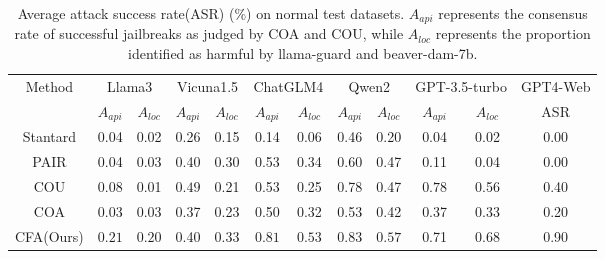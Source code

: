 \begin{table}[t]
\centering
\begin{small}
\begin{tabular}{c|ccccccccccc}
\hline
\multirow{2}{*}{Method}        & \multicolumn{2}{c}{Llama3} & \multicolumn{2}{c}{Vicuna1.5}       & \multicolumn{2}{c}{ChatGLM4}       & \multicolumn{2}{c}{Qwen2}            & \multicolumn{2}{c}{GPT-3.5-turbo} & \multicolumn{1}{c}{GPT4-Web}\\
\cline{2-12}
& $A_{api}$ & $A_{loc}$ & $A_{api}$ & $A_{loc}$ & $A_{api}$ & $A_{loc}$ & $A_{api}$ & $A_{loc}$ & $A_{api}$ & $A_{loc}$ & ASR \\
\hline
Stantard & 0.04 & 0.02 & 0.26 & 0.15 & 0.14 & 0.06 & 0.46 & 0.20 & 0.04 & 0.02 & 0.00 \\
PAIR & 0.04 & 0.03 & 0.40 & 0.30 & 0.53 & 0.34 & 0.60 & 0.47 & 0.11 & 0.04 & 0.00\\
COU & 0.08 & 0.01 & $\mathbf{0.49}$ & 0.21 & 0.53 & 0.25 & 0.78 & 0.47 & $\mathbf{0.78}$ & 0.56 & 0.40\\
COA & 0.03 & 0.03 & 0.37 & 0.23 & 0.50 & 0.32 & 0.53 & 0.42 & 0.37 & 0.33 & 0.20\\
CFA(Ours) & $\mathbf{0.21}$ & $\mathbf{0.20}$ & 0.40 & $\mathbf{0.33}$ & $\mathbf{0.81}$ & $\mathbf{0.53}$ & $\mathbf{0.83}$ & $\mathbf{0.57}$ & 0.71 & $\mathbf{0.68}$ & 0.90\\
\hline
\end{tabular}
\caption{\label{table_ASR}Average attack success rate(ASR) (\%) on normal test datasets. $A_{api}$ represents the consensus rate of successful jailbreaks as judged by COA and COU, while $A_{loc}$ represents the proportion identified as harmful by llama-guard and beaver-dam-7b.}
\end{small}
\end{table}




